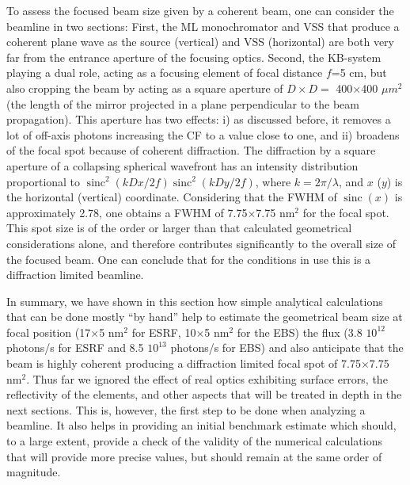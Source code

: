 \documentclass{iucr}              %
\newcommand{\todo}[1]{{\color{red}[TODO: "#1'']}}
\DeclareMathOperator{\sinc}{sinc}
\begin{document}
To assess the focused beam size given by a coherent beam, one can consider the beamline in two sections: First, the ML monochromator and VSS that produce a coherent plane wave as the source (vertical) and VSS (horizontal) are both very far from the entrance aperture of the focusing optics. Second, the KB-system playing a dual role, acting as a focusing element of focal distance $f$=5 cm, but also cropping the beam by acting as a square aperture of $D \times D=$ 400$\times$400 $\mu m^2$ (the length of the mirror projected in a plane perpendicular to the beam propagation).
This aperture has two effects: i) as discussed before, it removes a lot of off-axis photons increasing the CF to a value close to one, and ii) broadens of the focal spot because of coherent diffraction. The diffraction by a square aperture of a collapsing spherical wavefront has an intensity distribution proportional to $\sinc^2(k D x/2 f) \sinc^2(k D y / 2 f)$,
where $k=2\pi/\lambda$, and $x$ ($y$) is the horizontal (vertical) coordinate. Considering that the FWHM of $\sinc(x)$ is approximately 2.78, one obtains a FWHM of 7.75$\times$7.75 nm$^2$ for the focal spot. This spot size is of the order or larger than that calculated geometrical considerations alone, and therefore contributes significantly to the overall size of the focused beam. One can conclude that for the conditions in use this is a diffraction limited beamline. 


In summary, we have shown in this section how simple analytical calculations that can be done mostly ``by hand'' help to estimate the geometrical beam size at focal position (17$\times$5 nm$^2$ for ESRF, 10$\times$5 nm$^2$ for the EBS) the flux (3.8 $10^{12}$ photons/s for ESRF and 8.5 $10^{13}$ photons/s for EBS) and also anticipate that the beam is highly coherent producing a diffraction limited focal spot of  7.75$\times$7.75 nm$^2$. Thus far we ignored  the effect of real optics exhibiting surface errors, the reflectivity of the elements, and other aspects that will be treated in depth in the next sections. This is, however, the first step to be done when analyzing a beamline. It also helps in providing an initial benchmark estimate which should, to a large extent, provide a check of the validity of the numerical calculations that will provide more precise values, but should remain at the same order of magnitude.  
\end{document}
